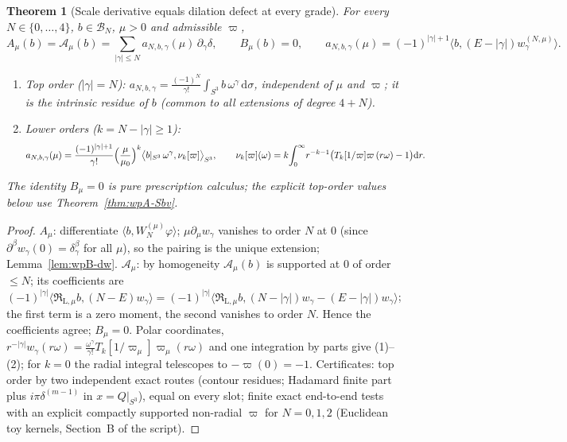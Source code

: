 \documentclass{article}
\newtheorem{theorem}[proposition]{Theorem}
\theoremstyle{remark}
\begin{document}
\begin{theorem}[Scale derivative equals dilation defect at every grade]
\label{thm:wpB-B0}
For every $N\in\{0,\dots,4\}$, $b\in\mathcal B_N$, $\mu>0$ and admissible $\varpi$,
\[
A_\mu(b)=\mathcal A_\mu(b)=\sum_{|\gamma|\le N}a_{N,b,\gamma}(\mu)\,\partial_\gamma\delta,\qquad B_\mu(b)=0,
\qquad
a_{N,b,\gamma}(\mu)=(-1)^{|\gamma|+1}\bigl\langle b,(E-|\gamma|)w^{(N,\mu)}_\gamma\bigr\rangle .
\]
\begin{enumerate}
\item \emph{Top order} ($|\gamma|=N$): $a_{N,b,\gamma}=\frac{(-1)^N}{\gamma!}\int_{S^3}b\,\omega^\gamma\,\mathrm d\sigma$, independent of $\mu$ and $\varpi$; it is the intrinsic residue of $b$ (common to all extensions of degree $4+N$).
\item \emph{Lower orders} ($k=N-|\gamma|\ge1$):
\begin{equation}
a_{N,b,\gamma}(\mu)=\frac{(-1)^{|\gamma|+1}}{\gamma!}\Bigl(\frac\mu{\mu_0}\Bigr)^{k}\bigl\langle b|_{S^3}\,\omega^\gamma,\nu_k[\varpi]\bigr\rangle_{S^3},
\qquad
\nu_k[\varpi](\omega)=k\!\int_0^\infty\! r^{-k-1}\bigl(T_k[1/\varpi]\varpi\,(r\omega)-1\bigr)\mathrm dr .
\label{eq:wpB-nu}
\end{equation}
\end{enumerate}
The identity $B_\mu=0$ is pure prescription calculus; the explicit top-order values below use Theorem~\ref{thm:wpA-Sbv}.
\end{theorem}
\begin{proof}
$A_\mu$: differentiate $\langle b,W^{(\mu)}_N\varphi\rangle$; $\mu\partial_\mu w_\gamma$ vanishes to order $N$ at $0$ (since $\partial^\beta w_\gamma(0)=\delta^\beta_\gamma$ for all $\mu$), so the pairing is the unique extension; Lemma~\ref{lem:wpB-dw}.
$\mathcal A_\mu$: by homogeneity $\mathcal A_\mu(b)$ is supported at $0$ of order $\le N$; its coefficients are $(-1)^{|\gamma|}\langle\mathfrak R_{\mathrm L,\mu}b,(N-E)w_\gamma\rangle=(-1)^{|\gamma|}\langle\mathfrak R_{\mathrm L,\mu}b,(N-|\gamma|)w_\gamma-(E-|\gamma|)w_\gamma\rangle$; the first term is a zero moment, the second vanishes to order $N$. Hence the coefficients agree; $B_\mu=0$.
Polar coordinates, $r^{-|\gamma|}w_\gamma(r\omega)=\frac{\omega^\gamma}{\gamma!}T_k[1/\varpi_\mu]\varpi_\mu(r\omega)$ and one integration by parts give (1)--(2); for $k=0$ the radial integral telescopes to $-\varpi(0)=-1$.
Certificates: top order by two independent exact routes (contour residues; Hadamard finite part plus $i\pi\delta^{(m-1)}$ in $x=Q|_{S^3}$), equal on every slot; finite exact end-to-end tests with an explicit compactly supported non-radial $\varpi$ for $N=0,1,2$ (Euclidean toy kernels, Section~B of the script).
\end{proof}
\end{document}
